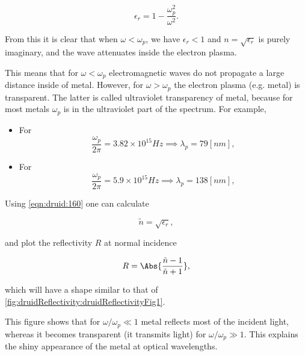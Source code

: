 \begin{dmath}\label{eqn:druid:160}
\epsilon_r = 1 - \frac{\omega_p^2}{\omega^2}.
\end{dmath}

From this it is clear that when \( \omega < \omega_p \), we have \( \epsilon_r < 1 \) and \( n = \sqrt{\epsilon_r} \) is purely imaginary, and the wave attenuates inside the electron plasma.

This means that for \( \omega < \omega_p \) electromagnetic waves do not propagate a large distance inside of metal.  However, for \( \omega > \omega_p \) the electron plasma (e.g. metal) is transparent.  The latter is called ultraviolet transparency of metal, because for most metals \( \omega_p \) is in the ultraviolet part of the spectrum.  For example, 

\begin{itemize}
\item For 
\begin{dmath}\label{eqn:druid:180}
\frac{\omega_p}{2 \pi} = 3.82 \times 10^{15} \si{Hz} \implies \lambda_p = 79 [nm],
\end{dmath}
\item For 
\begin{dmath}\label{eqn:druid:200}
\frac{\omega_p}{2 \pi} = 5.9 \times 10^{15} \si{Hz} \implies \lambda_p = 138 [nm],
\end{dmath}
\end{itemize}

Using \cref{eqn:druid:160} one can calculate 

\begin{dmath}\label{eqn:druid:220}
\tilde{n} = \sqrt{\epsilon_r},
\end{dmath}

and plot the reflectivity \( R \) at normal incidence

\begin{dmath}\label{eqn:druid:240}
R = \Abs{ \frac{\tilde{n} - 1 }{\tilde{n} + 1} },
\end{dmath}

which will have a shape similar to that of \cref{fig:druidReflectivity:druidReflectivityFig1}.


This figure shows that for \( \omega/\omega_p \ll 1 \) metal reflects most of the incident light, whereas it becomes transparent (it transmits light) for \( \omega/\omega_p \gg 1 \).  This explains the shiny appearance of the metal at optical wavelengths.

